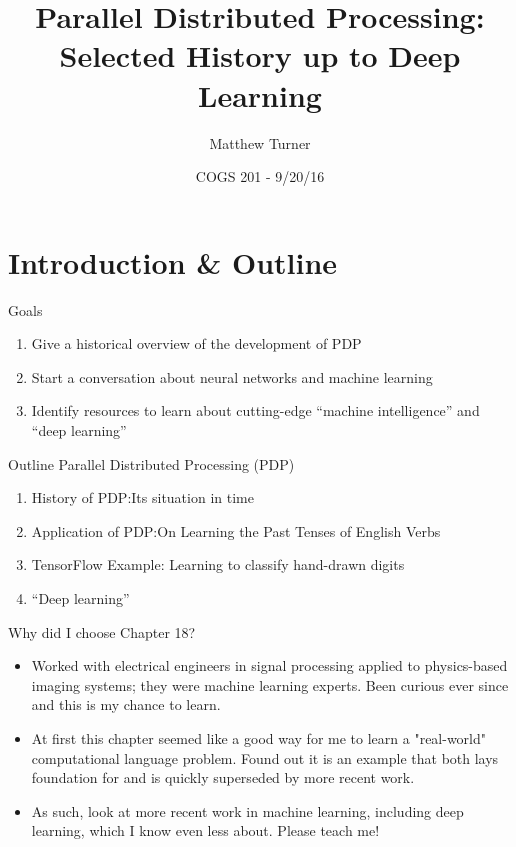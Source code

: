 \documentclass{beamer}
\title[]{Parallel Distributed Processing: Selected History up to Deep Learning}
\author{Matthew Turner}
\date{COGS 201 - 9/20/16}
\begin{document}
\begin{frame}
    \titlepage
\end{frame}

\section{Introduction \& Outline}
\begin{frame}{Goals}
    \begin{enumerate}
        \item Give a historical overview of the development of PDP
        \item Start a conversation about neural networks and machine learning
        \item Identify resources to learn about cutting-edge ``machine intelligence''
            and ``deep learning''
    \end{enumerate}
\end{frame}


\begin{frame}{Outline}
    Parallel Distributed Processing (PDP)
    \begin{enumerate}
        \item History of PDP:\@ Its situation in time
        \item Application of PDP:\@ On Learning the Past Tenses of English Verbs
        \item TensorFlow Example: Learning to classify hand-drawn digits
        \item ``Deep learning''
    \end{enumerate}
\end{frame}

\begin{frame}{Why did I choose Chapter 18?}
    \begin{itemize}
        \item Worked with electrical engineers in signal processing applied to
            physics-based imaging systems; they were machine learning experts.
            Been curious ever since and this is my chance to learn.
        \item At first this chapter seemed like a good way for me to
            learn a "real-world" computational language problem. Found out it
            is an example that both lays foundation for and is quickly superseded
            by more recent work.
        \item As such, look at more recent work in
            machine learning, including deep learning, which I know even
            less about. Please teach me!
    \end{itemize}
\end{frame}
\end{document}
